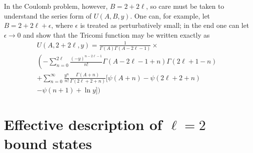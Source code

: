 \documentclass[pra,twocolumn,nofootinbib, superscriptaddress]{revtex4}%
\def\sec#1{\section{#1} }
\def\({\left(}
\def\){\right)}
\def\f#1#2{\frac{#1}{#2}}
\def\ep{\epsilon}
\begin{document}
In the Coulomb problem, however, $B=2+2\ell$, so care must be taken to understand the series form of $U(A,B,y)$. One can, for example, let $B=2+2\ell +\ep$, where $\ep$ is treated as perturbatively small; in the end one can let $\ep\to0$ and show that the Tricomi function may be written exactly as
\begin{multline}
U\(A,2+2\ell,y\) = \f{1}{\Gamma\(A\)\Gamma\(A-2\ell-1\)}\times\\
\(-\sum_{n=0}^{2\ell}\f{\(-y\)^{n-2\ell-1}}{n!}\Gamma\(A-2\ell-1+n\)\Gamma\(2\ell+1-n\)   \right.\\
\left. + \sum_{n=0}^{\infty}\f{y^n}{n!}\f{\Gamma(A+n)}{\Gamma(2\ell+2+n)}\biggl[\psi(A+n)-\psi(2\ell+2+n)\right.\\
-\psi(n+1) +\ln{y}   \biggr]   \Biggr) 
\end{multline}







\sec{Effective description of $\ell=2$ bound states}\label{Appendix_l_equal_2}
\end{document}
